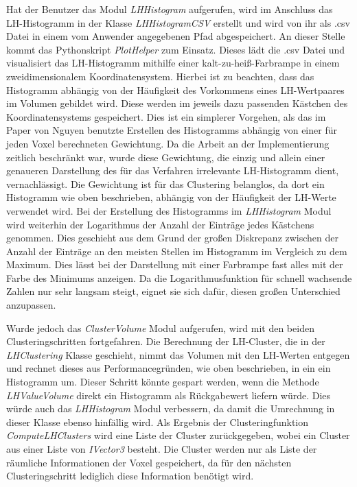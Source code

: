 Hat der Benutzer das Modul \textit{LHHistogram} aufgerufen, wird im Anschluss das LH-Histogramm in der Klasse \textit{LHHistogramCSV} erstellt und wird von ihr als .csv Datei in einem vom Anwender angegebenen Pfad abgespeichert.
\newline
An dieser Stelle kommt das Pythonskript \textit{PlotHelper} zum Einsatz. Dieses lädt die .csv Datei und visualisiert das LH-Histogramm mithilfe einer kalt-zu-heiß-Farbrampe in einem zweidimensionalem Koordinatensystem.
\newline
Hierbei ist zu beachten, dass das Histogramm abhängig von der Häufigkeit des Vorkommens eines LH-Wertpaares im Volumen gebildet wird. Diese werden im jeweils dazu passenden Kästchen des Koordinatensystems gespeichert. Dies ist ein simplerer Vorgehen, als das im Paper von Nguyen \cite{nguyen2012clustering} benutzte Erstellen des Histogramms abhängig von einer für jeden Voxel berechneten Gewichtung. Da die Arbeit an der Implementierung zeitlich beschränkt war, wurde diese Gewichtung, die einzig und allein einer genaueren Darstellung des für das Verfahren irrelevante LH-Histogramm dient, vernachlässigt. Die Gewichtung ist für das Clustering belanglos, da dort ein Histogramm wie oben beschrieben, abhängig von der Häufigkeit der LH-Werte verwendet wird.
\newline
Bei der Erstellung des Histogramms im \textit{LHHistogram} Modul wird weiterhin der Logarithmus der Anzahl der Einträge jedes Kästchens genommen. Dies geschieht aus dem Grund der großen Diskrepanz zwischen der Anzahl der Einträge an den meisten Stellen im Histogramm im Vergleich zu dem Maximum. Dies lässt bei der Darstellung mit einer Farbrampe fast alles mit der Farbe des Minimums anzeigen. Da die Logarithmusfunktion für schnell wachsende Zahlen nur sehr langsam steigt, eignet sie sich dafür, diesen großen Unterschied anzupassen.


Wurde jedoch das \textit{ClusterVolume} Modul aufgerufen, wird mit den beiden Clusteringschritten fortgefahren.
\newline
Die Berechnung der LH-Cluster, die in der \textit{LHClustering} Klasse geschieht, nimmt das Volumen mit den LH-Werten entgegen und rechnet dieses aus Performancegründen, wie oben beschrieben, in ein ein Histogramm um. Dieser Schritt könnte gespart werden, wenn die Methode \textit{LHValueVolume} direkt ein Histogramm als Rückgabewert liefern würde. Dies würde auch das \textit{LHHistogram} Modul verbessern, da damit die Umrechnung in dieser Klasse ebenso hinfällig wird. Als Ergebnis der Clusteringfunktion \textit{ComputeLHClusters} wird eine Liste der Cluster zurückgegeben, wobei ein Cluster aus einer Liste von \textit{IVector3} besteht. Die Cluster werden nur als Liste der räumliche Informationen der Voxel gespeichert, da für den nächsten Clusteringschritt  lediglich diese Information benötigt wird. 



